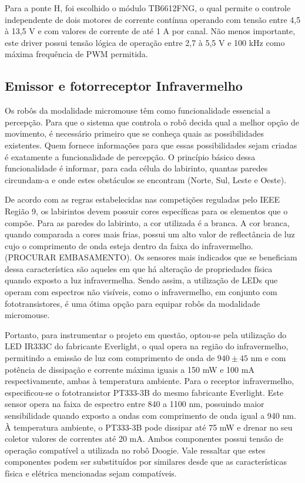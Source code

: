 Para a ponte H, foi escolhido o módulo TB6612FNG, o qual permite o controle independente de dois motores de corrente contínua operando com tensão entre 4,5 à 13,5 V e com valores de corrente de até 1 A por canal. Não menos importante, este driver possui tensão lógica de operação entre 2,7 à 5,5 V e 100 kHz como máxima frequência de PWM permitida.

\subsection{Emissor e fotorreceptor Infravermelho}
\label{ssec:emissor_e_fotoreceptor_ir}
Os robôs da modalidade micromouse têm como funcionalidade essencial a percepção. Para que o sistema que controla  o robô decida qual a melhor opção de movimento, é necessário primeiro que se conheça quais as possibilidades existentes. Quem fornece informações para que essas possibilidades sejam criadas é exatamente a funcionalidade de percepção. O princípio básico dessa funcionalidade  é informar, para cada célula do labirinto, quantas paredes circundam-a e onde estes obstáculos se encontram (Norte, Sul, Leste e Oeste).

De acordo com as regras estabelecidas nas competições reguladas pelo IEEE Região 9, os labirintos devem possuir cores específicas para os elementos que o compõe. Para as paredes do labirinto, a cor utilizada é a branca. A cor branca, quando comparada a cores mais frias, possui um alto valor de reflectância de luz cujo o comprimento de onda esteja dentro da faixa do infravermelho. (PROCURAR EMBASAMENTO). Os sensores mais indicados que se beneficiam dessa característica são aqueles em que há alteração de propriedades física quando exposto a luz infravermelha. Sendo assim, a utilização de LEDs que operam com espectros não visíveis, como o infravermelho, em conjunto com fototransistores, é uma ótima opção para equipar robôs da modalidade micromouse.

Portanto, para instrumentar o projeto em questão, optou-se pela utilização do LED IR333C do fabricante Everlight, o qual opera na região do infravermelho, permitindo a emissão de luz com comprimento de onda de $940 \pm 45$ nm e com potência de dissipação e corrente máxima iguais a 150 mW e 100 mA respectivamente, ambas à temperatura ambiente. Para o receptor infravermelho, especificou-se o fototransistor PT333-3B do mesmo fabricante Everlight. Este sensor opera na faixa de espectro entre 840 a 1100 nm, possuindo maior sensibilidade quando exposto a ondas com comprimento de onda igual a 940 nm. À temperatura ambiente, o PT333-3B pode dissipar até 75 mW e drenar no seu coletor valores de correntes até 20 mA. Ambos componentes possui tensão de operação compatível a utilizada no robô Doogie. Vale ressaltar que estes componentes podem ser substituídos por similares desde que as características física e elétrica mencionadas sejam compatíveis.

